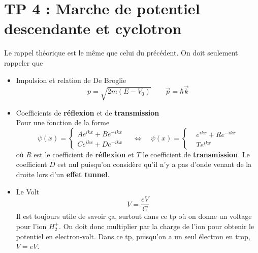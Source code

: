 \section*{TP 4 : Marche de potentiel descendante et cyclotron}
Le rappel théorique est le même que celui du précédent. On doit seulement rappeler que 
\begin{itemize}
	\item Impulsion et relation de De Broglie
		\begin{equation}
			p = \sqrt{2m(E-V_0)} \qquad  \vec{p} = \hbar \vec{k}
		\end{equation}
		
	\item Coefficients de \textbf{réflexion} et de \textbf{transmission}\\
		Pour une fonction de la forme
		\begin{equation}
			\psi(x) = 
			\left\{
			\begin{aligned}
			Ae^{ikx}+Be^{-ikx} \\
			Ce^{ikx}+De^{-ikx} 
			\end{aligned}			
			\right.
			\quad			
			\Leftrightarrow 
			\quad
			\psi(x) = 
			\left\{
			\begin{aligned}
			&e^{ikx}+Re^{-ikx} \\
			&Te^{ikx} 
			\end{aligned}			
			\right.
		\end{equation}
		où $R$ est le coefficient de \textbf{réflexion} et $T$ le coefficient de \textbf{transmission}. Le coefficient $D$ est nul puisqu'on considère qu'il n'y a pas d'onde venant de la droite lors d'un \textbf{effet tunnel}.
		
	\item Le Volt 
		\begin{equation}
			V = \frac{eV}{C}
		\end{equation}
		Il est toujours utile de savoir ça, surtout dans ce tp où on donne un voltage pour l'ion $H_2^+$. On doit donc multiplier par la charge de l'ion pour obtenir le potentiel en electron-volt. Dans ce tp, puisqu'on a un seul électron en trop, $V = eV$.
\end{itemize}